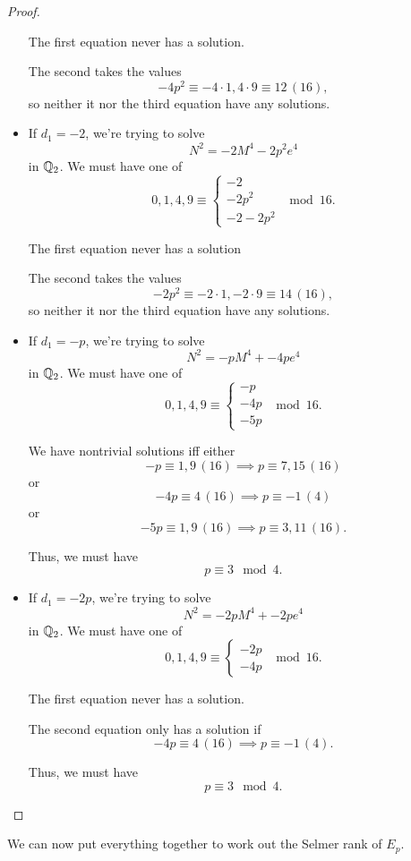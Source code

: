 \documentclass[12pt, a4paper]{amsart}
\begin{document}
\begin{proof}
\begin{itemize}
    The first equation never has a solution.

    The second takes the values
    \[-4p^2 \equiv -4\cdot 1, 4 \cdot 9 \equiv 12 \, (16),\]
    so neither it nor the third equation have any solutions.


    \item If $d_1 = -2$, we're trying to solve
    \[N^2 = -2M^4 - 2p^2e^4 \] in ${\mathbb Q}_2$. 
    We must have one of
    \[0, 1, 4, 9 \equiv
      \begin{cases}
        -2 \\
        -2p^2 \\
        -2-2p^2
      \end{cases} \mod{16}.
    \]

    The first equation never has a solution

    The second takes the values
    \[-2p^2 \equiv -2\cdot 1, -2 \cdot 9 \equiv 14 \, (16), \]
    so neither it nor the third equation have any solutions.

    \item If $d_1 = -p$, we're trying to solve
    \[N^2 = -pM^4 + -4pe^4 \] in ${\mathbb Q}_2$. 
    We must have one of
    \[0, 1, 4, 9 \equiv
      \begin{cases}
        -p \\
        -4p \\
        -5p
      \end{cases} \mod{16}.
    \]

    We have nontrivial solutions iff either
    \[-p \equiv 1,9 \, (16) \implies p \equiv 7, 15 \, (16)\]
    or
    \[-4p \equiv 4 \, (16) \implies p \equiv -1 \, (4)\]
    or
    \[-5p \equiv 1,9 \, (16) \implies p \equiv 3, 11 \, (16).\]

    Thus, we must have
    \[p \equiv 3 \mod{4}.\]

    \item If $d_1 = -2p$, we're trying to solve
    \[N^2 = -2pM^4 + -2pe^4 \] in ${\mathbb Q}_2$. 
    We must have one of
    \[0, 1, 4, 9 \equiv
      \begin{cases}
        -2p \\
        -4p 
      \end{cases} \mod{16}.
    \]

    The first equation never has a solution.

    The second equation only has a solution if
    \[-4p \equiv 4 \, (16) \implies p \equiv -1 \, (4).\]

    Thus, we must have
    \[p \equiv 3 \mod{4}.\]

  \end{itemize}
\end{proof}
We can now put everything together to work out the Selmer rank of $E_p$.
\end{document}

